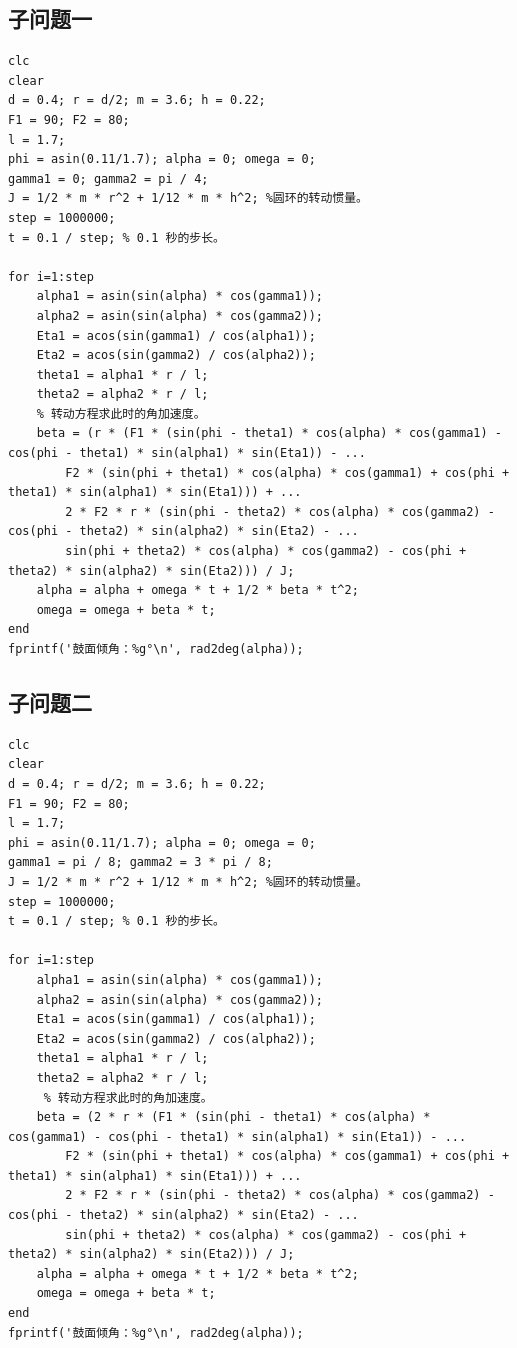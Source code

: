 \documentclass{cumcm}
\begin{document}
\subsection{子问题一}
\begin{lstlisting}
clc
clear
d = 0.4; r = d/2; m = 3.6; h = 0.22;
F1 = 90; F2 = 80;
l = 1.7;
phi = asin(0.11/1.7); alpha = 0; omega = 0;
gamma1 = 0; gamma2 = pi / 4;
J = 1/2 * m * r^2 + 1/12 * m * h^2; %圆环的转动惯量。
step = 1000000;
t = 0.1 / step; % 0.1 秒的步长。

for i=1:step
    alpha1 = asin(sin(alpha) * cos(gamma1));
    alpha2 = asin(sin(alpha) * cos(gamma2));
    Eta1 = acos(sin(gamma1) / cos(alpha1));
    Eta2 = acos(sin(gamma2) / cos(alpha2));
    theta1 = alpha1 * r / l;
    theta2 = alpha2 * r / l;
    % 转动方程求此时的角加速度。
    beta = (r * (F1 * (sin(phi - theta1) * cos(alpha) * cos(gamma1) - cos(phi - theta1) * sin(alpha1) * sin(Eta1)) - ...
        F2 * (sin(phi + theta1) * cos(alpha) * cos(gamma1) + cos(phi + theta1) * sin(alpha1) * sin(Eta1))) + ...
        2 * F2 * r * (sin(phi - theta2) * cos(alpha) * cos(gamma2) - cos(phi - theta2) * sin(alpha2) * sin(Eta2) - ...
        sin(phi + theta2) * cos(alpha) * cos(gamma2) - cos(phi + theta2) * sin(alpha2) * sin(Eta2))) / J;
    alpha = alpha + omega * t + 1/2 * beta * t^2;
    omega = omega + beta * t;
end
fprintf('鼓面倾角：%g°\n', rad2deg(alpha));
\end{lstlisting}

\subsection{子问题二}
\begin{lstlisting}
clc
clear
d = 0.4; r = d/2; m = 3.6; h = 0.22;
F1 = 90; F2 = 80;
l = 1.7;
phi = asin(0.11/1.7); alpha = 0; omega = 0;
gamma1 = pi / 8; gamma2 = 3 * pi / 8;
J = 1/2 * m * r^2 + 1/12 * m * h^2; %圆环的转动惯量。
step = 1000000;
t = 0.1 / step; % 0.1 秒的步长。

for i=1:step
    alpha1 = asin(sin(alpha) * cos(gamma1));
    alpha2 = asin(sin(alpha) * cos(gamma2));
    Eta1 = acos(sin(gamma1) / cos(alpha1));
    Eta2 = acos(sin(gamma2) / cos(alpha2));
    theta1 = alpha1 * r / l;
    theta2 = alpha2 * r / l;
     % 转动方程求此时的角加速度。
    beta = (2 * r * (F1 * (sin(phi - theta1) * cos(alpha) * cos(gamma1) - cos(phi - theta1) * sin(alpha1) * sin(Eta1)) - ...
        F2 * (sin(phi + theta1) * cos(alpha) * cos(gamma1) + cos(phi + theta1) * sin(alpha1) * sin(Eta1))) + ...
        2 * F2 * r * (sin(phi - theta2) * cos(alpha) * cos(gamma2) - cos(phi - theta2) * sin(alpha2) * sin(Eta2) - ...
        sin(phi + theta2) * cos(alpha) * cos(gamma2) - cos(phi + theta2) * sin(alpha2) * sin(Eta2))) / J;
    alpha = alpha + omega * t + 1/2 * beta * t^2;
    omega = omega + beta * t;
end
fprintf('鼓面倾角：%g°\n', rad2deg(alpha));
\end{lstlisting}
\end{document}
